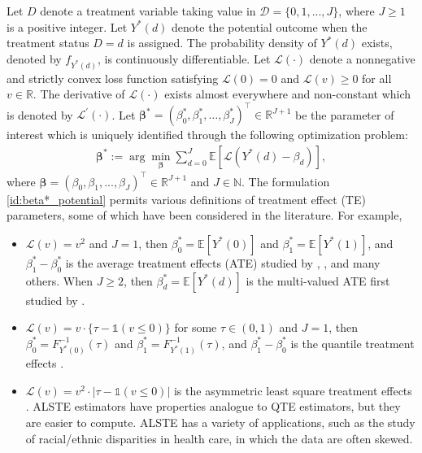 \documentclass[11pt]{article}
\numberwithin{equation}{section}
\begin{document}
Let $D$ denote a treatment variable taking value in $\mathcal{D}=\{0,1,...,J\}$, where $J\geq 1$ is a positive integer. Let $
Y^*(d)$ denote the potential outcome when the treatment status $D=d$ is assigned. The probability density of $Y^*(d)$ exists, denoted by $f_{Y^*(d)}$, is continuously differentiable.   Let $\mathcal{L}(\cdot
)$ denote a nonnegative and strictly convex loss function satisfying $\mathcal{L}(0)=0$ and $\mathcal{L}(v)\geq 0$ for all $v\in\mathbb{R}$. The derivative of $\mathcal{L}(\cdot)$ exists almost everywhere and non-constant which is denoted by $
\mathcal{L}^{\prime }(\cdot )$. Let $\boldsymbol{\beta}^*=({\beta}^*_0,{\beta}^*_1,\ldots,{\beta}^*_J)^\top\in\mathbb{R}^{J+1}$ be the parameter of interest which is uniquely identified through the following optimization problem:
\begin{align}\label{id:beta*_potential}
	\boldsymbol{\beta}^*:=\arg\min_{\boldsymbol{\beta}}\sum_{d=0}^J\mathbb{E}\left[\mathcal{L}\left(Y^*(d)-\beta_d\right)\right],
\end{align}
where $\boldsymbol{\beta}=(\beta_0,\beta_1,...,\beta_J)^\top\in\mathbb{R}^{J+1}$ and $J\in\mathbb{N}$.  The formulation \eqref{id:beta*_potential} permits various definitions of treatment effect (TE) parameters, some of which have been considered in the literature. For example,
\begin{itemize}
	\item $\mathcal{L}(v)=v^2$ and $J=1$,  then $\beta^*_0=\mathbb{E}[Y^*(0)]$ and $\beta^*_1=\mathbb{E}[Y^*(1)]$, and $\beta^*_1-\beta^*_0$ is the average treatment effects (ATE) studied by \cite{hahn1998role}, \cite{Hirano03}, \cite{chan2016globally} and many others. When $J\geq 2$, then $\beta^*_d=\mathbb{E}[Y^*(d)]$ is the multi-valued ATE first studied by \cite{cattaneo2010efficient}.
	\item $\mathcal{L}(v)=v\cdot\{\tau-\mathds{1}(v\leq 0)\}$ for some $\tau\in (0,1)$ and $J= 1$, then $\beta^*_0=F_{Y^*(0)}^{-1}(\tau)$ and $\beta^*_1=F_{Y^*(1)}^{-1}(\tau)$, and $\beta^*_1-\beta^*_0$ is the quantile treatment effects \citep[QTE,][]{Firpo2007Efficient,chen2008semiparametric,HKZ2019}.
	\item $\mathcal{L}(v)=v^2\cdot |\tau-\mathds{1}(v\leq 0)|$ is the asymmetric least  square treatment effects \citep[ALSTE,][]{newey1987asymmetric}. {\color{black} ALSTE estimators have properties analogue to QTE estimators, but they are easier to compute. ALSTE has a variety of applications, such as the study of racial/ethnic disparities in health care, in which the data are often skewed.
		}
\end{itemize}
\end{document}
